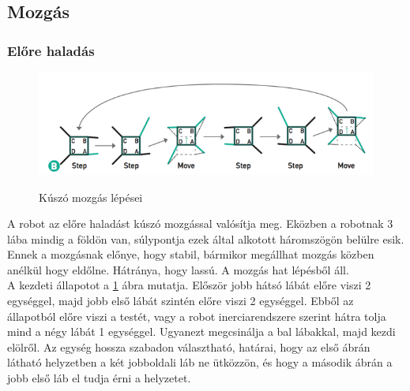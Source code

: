 \documentclass{article}
\begin{document}
\subsection{Mozgás}
\subsubsection{Előre haladás}
\begin{figure}[h]
	\begin{minipage}{0.9\textwidth}
		\caption{Kúszó mozgás lépései}
		\includegraphics[width=\textwidth]{kuszomozgas}
		\label{fig:mozgas}
	\end{minipage}
\end{figure}
A robot az előre haladást kúszó mozgással valósítja meg. Eközben a robotnak 3 lába mindig a földön van, súlypontja ezek által alkotott háromszögön belülre esik. Ennek a mozgásnak előnye, hogy stabil, bármikor megállhat mozgás közben anélkül hogy eldőlne. Hátránya, hogy lassú. A mozgás hat lépésből áll.\\
A kezdeti állapotot a \ref{fig:mozgas} ábra mutatja. Először jobb hátsó lábát előre viszi 2 egységgel, majd jobb első lábát szintén előre viszi 2 egységgel. Ebből az állapotból előre viszi a testét, vagy a robot inerciarendszere szerint hátra tolja mind a négy lábát 1 egységgel. Ugyanezt megcsinálja a bal lábakkal, majd kezdi elölről. Az egység hossza szabadon választható, határai, hogy az első ábrán látható helyzetben a két jobboldali láb ne ütközzön, és hogy a második ábrán a jobb első láb el tudja érni a helyzetet.
\end{document}
